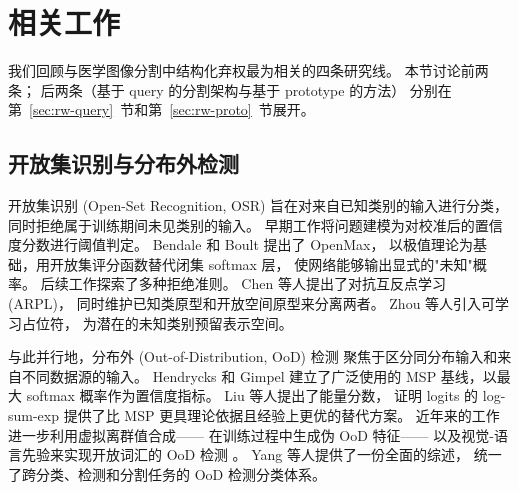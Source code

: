 \documentclass[3p,twocolumn,authoryear]{elsarticle}
\begin{document}
 
\section{相关工作}
\label{sec:related}
 
我们回顾与医学图像分割中结构化弃权最为相关的四条研究线。
本节讨论前两条；
后两条（基于 query 的分割架构与基于 prototype 的方法）
分别在第~\ref{sec:rw-query}~节和第~\ref{sec:rw-proto}~节展开。
 
\subsection{开放集识别与分布外检测}
\label{sec:rw-osr}
 
开放集识别 (Open-Set Recognition, OSR) 旨在对来自已知类别的输入进行分类，
同时拒绝属于训练期间未见类别的输入。
早期工作将问题建模为对校准后的置信度分数进行阈值判定。
Bendale 和 Boult 提出了 OpenMax，
以极值理论为基础，用开放集评分函数替代闭集 softmax 层，
使网络能够输出显式的"未知"概率\cite{bendale2016towardsopen}。
后续工作探索了多种拒绝准则。
Chen 等人提出了对抗互反点学习 (ARPL)，
同时维护已知类原型和开放空间原型来分离两者\cite{chen2022adversarialreciprocal}。
Zhou 等人引入可学习占位符，
为潜在的未知类别预留表示空间\cite{zhou2021learningplaceholders}。

与此并行地，分布外 (Out-of-Distribution, OoD) 检测
聚焦于区分同分布输入和来自不同数据源的输入。
Hendrycks 和 Gimpel
建立了广泛使用的 MSP 基线，以最大 softmax 概率作为置信度指标\cite{hendrycks2017baselinedetecting}。
Liu 等人提出了能量分数，
证明 logits 的 log-sum-exp 提供了比 MSP 更具理论依据且经验上更优的替代方案\cite{liu2020energyout}。
近年来的工作进一步利用虚拟离群值合成——
在训练过程中生成伪 OoD 特征——
以及视觉-语言先验来实现开放词汇的 OoD 检测
\cite{he2022ronfreliable,ming2022delvingout}。
Yang 等人提供了一份全面的综述，
统一了跨分类、检测和分割任务的 OoD 检测分类体系\cite{yang2024generalizedout}。
 
 
\end{document}
